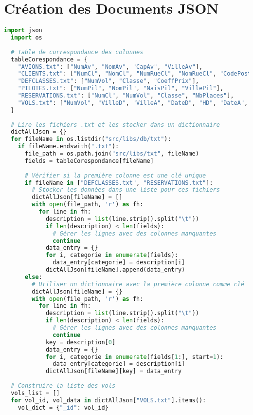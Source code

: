 \section{Création des Documents JSON}
\begin{lstlisting}[language=Python, caption=Script de création des documents JSON, label=lst:code_json]
  import json
  import os
  
  # Table de correspondance des colonnes
  tableCorespondance = {
    "AVIONS.txt": ["NumAv", "NomAv", "CapAv", "VilleAv"],
    "CLIENTS.txt": ["NumCl", "NomCl", "NumRueCl", "NomRueCl", "CodePosteCl", "VilleCl"],
    "DEFCLASSES.txt": ["NumVol", "Classe", "CoeffPrix"],
    "PILOTES.txt": ["NumPil", "NomPil", "NaisPil", "VillePil"],
    "RESERVATIONS.txt": ["NumCl", "NumVol", "Classe", "NbPlaces"],
    "VOLS.txt": ["NumVol", "VilleD", "VilleA", "DateD", "HD", "DateA", "HA", "NumPil", "NumAv"],
  }
  
  # Lire les fichiers .txt et les stocker dans un dictionnaire
  dictAllJson = {}
  for fileName in os.listdir("src/libs/db/txt"):
    if fileName.endswith(".txt"):
      file_path = os.path.join("src/libs/txt", fileName)
      fields = tableCorespondance[fileName]
  
      # Vérifier si la première colonne est une clé unique
      if fileName in ["DEFCLASSES.txt", "RESERVATIONS.txt"]:
        # Stocker les données dans une liste pour ces fichiers
        dictAllJson[fileName] = []
        with open(file_path, 'r') as fh:
          for line in fh:
            description = list(line.strip().split("\t"))
            if len(description) < len(fields):
              # Gérer les lignes avec des colonnes manquantes
              continue
            data_entry = {}
            for i, categorie in enumerate(fields):
              data_entry[categorie] = description[i]
            dictAllJson[fileName].append(data_entry)
      else:
        # Utiliser un dictionnaire avec la première colonne comme clé
        dictAllJson[fileName] = {}
        with open(file_path, 'r') as fh:
          for line in fh:
            description = list(line.strip().split("\t"))
            if len(description) < len(fields):
              # Gérer les lignes avec des colonnes manquantes
              continue
            key = description[0]
            data_entry = {}
            for i, categorie in enumerate(fields[1:], start=1):
              data_entry[categorie] = description[i]
            dictAllJson[fileName][key] = data_entry
  
  # Construire la liste des vols
  vols_list = []
  for vol_id, vol_data in dictAllJson["VOLS.txt"].items():
    vol_dict = {"_id": vol_id}
  

\end{lstlisting}
